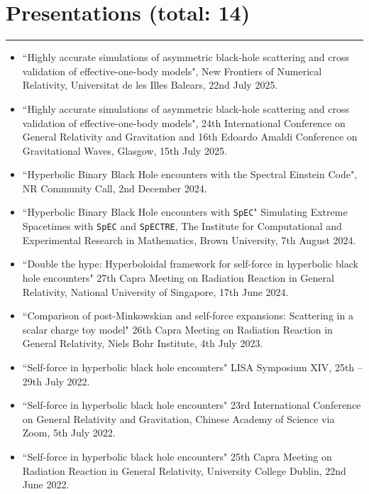 \documentclass[10.5pt, oneside]{article}   	%
\begin{document}
 {\color{Sectioncolour}
\section*{Presentations {\rm (total: 14)}}
\vspace{-3mm}
\noindent\rule{\linewidth}{0.6pt}}
\begin{itemize}
\item ``Highly accurate simulations of asymmetric black-hole scattering and cross validation of effective-one-body models", New Frontiers of Numerical Relativity, Universitat de les Illes Balears, 22nd July 2025.
\item ``Highly accurate simulations of asymmetric black-hole scattering and cross validation of effective-one-body models", 24th International Conference on General Relativity and Gravitation and 16th Edoardo Amaldi Conference on Gravitational Waves, Glasgow, 15th July 2025.
\item ``Hyperbolic Binary Black Hole encounters with the Spectral Einstein Code", NR Community Call, 2nd December 2024.
\item ``Hyperbolic Binary Black Hole encounters with \texttt{SpEC}" Simulating Extreme Spacetimes with \texttt{SpEC} and \texttt{SpECTRE}, The Institute for Computational and Experimental Research in Mathematics, Brown University, 7th August 2024.
\item ``Double the hype: Hyperboloidal framework for self-force in hyperbolic black hole encounters" 27th Capra Meeting on Radiation Reaction in General Relativity, National University of Singapore, 17th June 2024.
\item ``Comparison of post-Minkowskian and self-force expansions: Scattering in a scalar charge toy model" 26th Capra Meeting on Radiation Reaction in General Relativity, Niels Bohr Institute, 4th July 2023.
\item ``Self-force in hyperbolic black hole encounters" LISA Symposium XIV, 25th -- 29th July 2022. \href{https://www.youtube.com/watch?v=p2-RgYB6Jhk}{}
\item ``Self-force in hyperbolic black hole encounters" 23rd International Conference on General Relativity and Gravitation, Chinese Academy of Science via Zoom, 5th July 2022. \href{https://www.koushare.com/video/videodetail/30159}{}
\item ``Self-force in hyperbolic black hole encounters" 25th Capra Meeting on Radiation Reaction in General Relativity, University College Dublin, 22nd June 2022. \href{https://oliverlong.info/talks/capra25}{}

\end{itemize}
\end{document}
